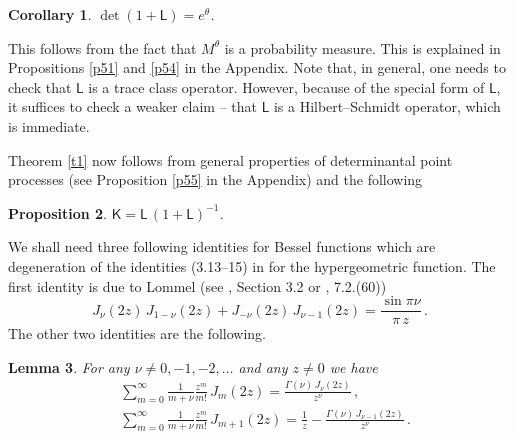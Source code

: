 \documentclass[12pt]{amsart}
\newcommand{\KK}{\mathsf{K}}
\newcommand{\LL}{\mathsf{L}}
\newcommand{\ix}{\theta}
\theoremstyle{plain}
\newtheorem{lemma}{Lemma}[section]
\newtheorem{proposition}[lemma]{Proposition}
\newtheorem{corollary}[lemma]{Corollary}
\theoremstyle{definition}
\numberwithin{equation}{section}
\begin{document}
\begin{corollary}\label{c22}  $\det(1+\LL)=e^{\ix}$.
\end{corollary}

This follows from the fact that $M^\ix$ is a probability measure. 
This is explained in Propositions
\ref{p51} and \ref{p54} in the Appendix. Note that, in general, 
one needs to check that $\LL$ is a trace class operator. However, because of 
the special form of $\LL$,  it suffices to check a weaker claim -- that $\LL$ is a
Hilbert--Schmidt operator, which is immediate. 

Theorem \ref{t1} now follows from general properties of determinantal point
processes (see Proposition \ref{p55}  in the Appendix) and the following

\begin{proposition}\label{p23}  $\KK=\LL\,(1+\LL)^{-1}$.
\end{proposition}

We shall need three following identities for Bessel functions
which are degeneration of the identities (3.13--15) in \cite{BO}
for the hypergeometric function. The first identity is  due to Lommel 
 (see \cite{W}, Section 3.2 or \cite{HTF}, 7.2.(60))
%
\begin{equation}\label{e23}
J_\nu(2z)\,J_{1-\nu}(2z) + J_{-\nu}(2z)\, J_{\nu-1}(2z) = \frac{\sin\pi\nu}{\pi\, z} \,.
\end{equation}
%
The other two identities are the following.  

\begin{lemma}\label{l24} For any $\nu\ne 0,-1,-2,\dots$ and any $z\ne 0$ we have 
%
\begin{align}
&\sum_{m=0}^\infty  \frac1{m+\nu} \frac{z^m}{m!} \, J_m(2z)  
=\frac{\Gamma(\nu)\, J_\nu(2z)}{z^\nu}  \,,\label{e24}\\
&\sum_{m=0}^\infty  \frac1{m+\nu} \frac{z^m}{m!} \, J_{m+1}(2z)  =
\frac1z-\frac{\Gamma(\nu)\, J_{\nu-1}(2z)}{z^\nu} \label{e25}\,. 
\end{align}
%
\end{lemma}
\end{document}
